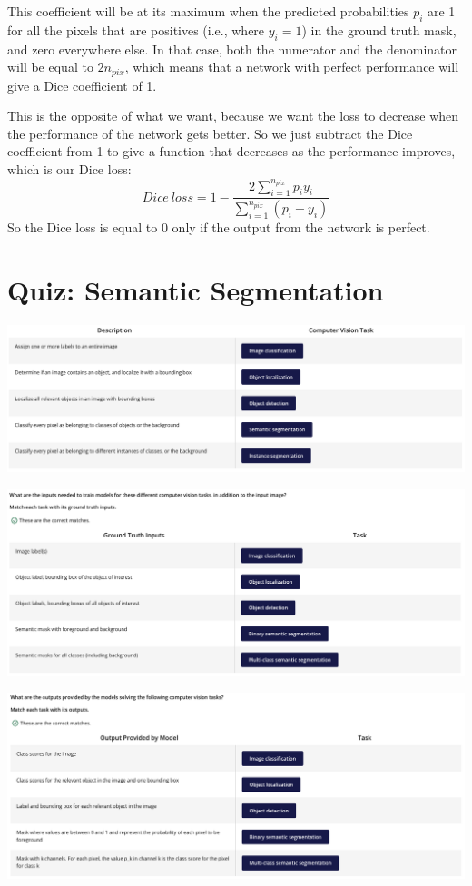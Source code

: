 This coefficient will be at its maximum when the predicted probabilities \(p_i\) are 1 for all the pixels that are positives (i.e., where \(y_i = 1\)) in the ground truth mask, and zero everywhere else. In that case, both the numerator and the denominator will be equal to \(2n_{pix}\), which means that a network with perfect performance will give a Dice coefficient of 1. \newline

This is the opposite of what we want, because we want the loss to decrease when the performance of the network gets better. So we just subtract the Dice coefficient from 1 to give a function that decreases as the performance improves, which is our Dice loss: \[Dice\ loss = 1 - \frac{2\sum_{i=1}^{n_{pix}} p_i y_i}{\sum_{i=1}^{n_{pix}} (p_i + y_i)}\]
So the Dice loss is equal to 0 only if the output from the network is perfect.

\section{Quiz: Semantic Segmentation}

\includegraphics[width=1\linewidth]{img//cnn//object/imagequiz.png}

\includegraphics[width=1\linewidth]{img//cnn//object/imageQuiz2.png}

\includegraphics[width=1\linewidth]{img//cnn//object/imagequiz3.png}


